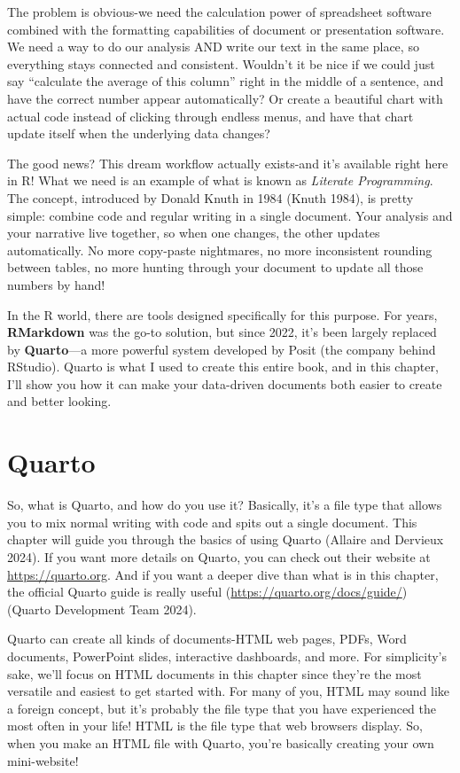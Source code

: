 \documentclass[
  letterpaper,
]{book}
\begin{document}
The problem is obvious-we need the calculation power of spreadsheet
software combined with the formatting capabilities of document or
presentation software. We need a way to do our analysis AND write our
text in the same place, so everything stays connected and consistent.
Wouldn't it be nice if we could just say ``calculate the average of this
column'' right in the middle of a sentence, and have the correct number
appear automatically? Or create a beautiful chart with actual code
instead of clicking through endless menus, and have that chart update
itself when the underlying data changes?

The good news? This dream workflow actually exists-and it's available
right here in R! What we need is an example of what is known as
\emph{Literate Programming}. The concept, introduced by Donald Knuth in
1984 (Knuth 1984), is pretty simple: combine code and regular writing in
a single document. Your analysis and your narrative live together, so
when one changes, the other updates automatically. No more copy-paste
nightmares, no more inconsistent rounding between tables, no more
hunting through your document to update all those numbers by hand!

In the R world, there are tools designed specifically for this purpose.
For years, \textbf{RMarkdown} was the go-to solution, but since 2022,
it's been largely replaced by \textbf{Quarto}---a more powerful system
developed by Posit (the company behind RStudio). Quarto is what I used
to create this entire book, and in this chapter, I'll show you how it
can make your data-driven documents both easier to create and better
looking.

\section{Quarto}\label{quarto}

So, what is Quarto, and how do you use it? Basically, it's a file type
that allows you to mix normal writing with code and spits out a single
document. This chapter will guide you through the basics of using Quarto
(Allaire and Dervieux 2024). If you want more details on Quarto, you can
check out their website at \url{https://quarto.org}. And if you want a
deeper dive than what is in this chapter, the official Quarto guide is
really useful (\url{https://quarto.org/docs/guide/}) (Quarto Development
Team 2024).

Quarto can create all kinds of documents-HTML web pages, PDFs, Word
documents, PowerPoint slides, interactive dashboards, and more. For
simplicity's sake, we'll focus on HTML documents in this chapter since
they're the most versatile and easiest to get started with. For many of
you, HTML may sound like a foreign concept, but it's probably the file
type that you have experienced the most often in your life! HTML is the
file type that web browsers display. So, when you make an HTML file with
Quarto, you're basically creating your own mini-website!
\end{document}
